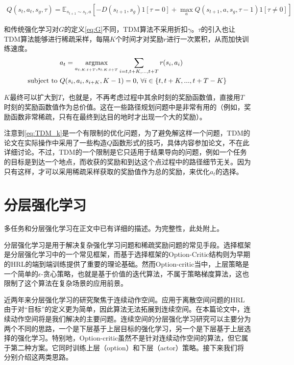     \begin{align}
      Q(s_t, a_t, s_g, \tau) = \mathbb{E}_{s_{t+1} \sim s_t, a}[-D(s_{t+1}, s_g)1[\tau = 0] + \max_a Q(s_{t+1}, a, s_g, \tau - 1)1[\tau \neq 0]]
    \end{align}
    \par 和传统强化学习对$G$的定义\eqref{eq:G}不同，TDM算法不采用折扣$\gamma$。$\tau$的引入也让TDM算法能够进行稀疏采样，每隔$K$个时间才对奖励$r$进行一次累积，从而加快训练速度。
    \begin{align}
    \begin{aligned}
      & a_t = \operatorname*{argmax}_{a_{t:K:t+T}, s_{t:K:t+T}} \sum_{i = t, t+K, ..., t+T} r(s_i, a_i)\\
      \text{subject to } &Q(s_i, a_i, s_{i+K}, K-1) = 0 \text{,   } \forall i \in \{t, t+K, ..., t+T-K\} 
      \label{eq:TDM_k}
    \end{aligned}
    \end{align}
    \par $K$最终可以扩大到$T$，也就是，不再考虑过程中其余时刻的奖励函数值，直接用$T$时刻的奖励函数值作为总价值。这在一些路径规划问题中是非常有用的（例如，奖励函数非常稀疏，只有在最终到达目的地时才出现一个大的奖励）。
    \par 注意到\eqref{eq:TDM_k}是一个有限制的优化问题，为了避免解这样一个问题，TDM的论文在实际操作中采用了一些构造$Q$函数形式的技巧，具体内容参加论文\cite{TDM}，不在此详细讨论。不过，TDM的一个限制是它只适用于结果导向的问题，例如一个任务的目标是到达一个地点，而收获的奖励和到达这个点过程中的路径细节无关。因为只有这样，才可以采用稀疏采样获取的奖励值作为总的奖励，来优化$a_t$的选择。
  
  \section{分层强化学习}
    多任务和分层强化学习在正文中已有详细的描述。为完整性，此处附上。

分层强化学习是用于解决复杂强化学习问题和稀疏奖励问题的常见手段\cite{Sutton:1999, HRL_with_maxQ, FUN, Barto_HRL}。选择框架\cite{Sutton:1998_options, Sutton:1999}是分层强化学习中的一个常见框架，而基于选择框架的Option-Critic结构\cite{option-critic}则为早期的HRL的端到端训练提供了重要的理论基础。然而Option-critic当中，上层策略是一个简单的$\epsilon$-贪心策略，也就是基于价值的迭代算法，不属于策略梯度算法，这也限制了这个算法在复杂场景的应用前景。

近两年来分层强化学习的研究聚焦于连续动作空间。应用于离散空间问题的HRL由于对``目标''的定义更为简单，因此算法无法拓展到连续空间。在本篇论文中，连续动作空间将是我们解决的主要问题。连续空间的分层强化学习研究可以主要分为两个不同的思路，一个是下层基于上层目标的强化学习，另一个是下层基于上层选择的强化学习。特别地，Option-critic虽然不是针对连续动作空间的算法，但它属于第二种方案。它同时训练上层（option）和下层（actor）策略。接下来我们将分别介绍这两类思路。

